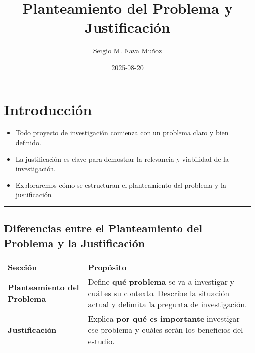 \documentclass[
  letterpaper,
  DIV=11,
  numbers=noendperiod]{scrartcl}
\title{Planteamiento del Problema y Justificación}
\author{Sergio M. Nava Muñoz}
\date{2025-08-20}
\providecommand{\tightlist}{%
  \setlength{\itemsep}{0pt}\setlength{\parskip}{0pt}}
\begin{document}
\maketitle


\section{Introducción}\label{introducciuxf3n}

\begin{itemize}
\tightlist
\item
  Todo proyecto de investigación comienza con un problema claro y bien
  definido.
\item
  La justificación es clave para demostrar la relevancia y viabilidad de
  la investigación.
\item
  Exploraremos cómo se estructuran el planteamiento del problema y la
  justificación.
\end{itemize}

\begin{center}\rule{0.5\linewidth}{0.5pt}\end{center}

\subsection{\texorpdfstring{\textbf{Diferencias entre el Planteamiento
del Problema y la
Justificación}}{Diferencias entre el Planteamiento del Problema y la Justificación}}\label{diferencias-entre-el-planteamiento-del-problema-y-la-justificaciuxf3n}

\begin{longtable}[]{@{}
  >{\raggedright\arraybackslash}p{}
  >{\raggedright\arraybackslash}p{}@{}}
\toprule\noalign{}
\begin{minipage}[b]{\linewidth}\raggedright
\textbf{Sección}
\end{minipage} & \begin{minipage}[b]{\linewidth}\raggedright
\textbf{Propósito}
\end{minipage} \\
\midrule\noalign{}
\endhead
\bottomrule\noalign{}
\endlastfoot
\textbf{Planteamiento del Problema} & Define \textbf{qué problema} se va
a investigar y cuál es su contexto. Describe la situación actual y
delimita la pregunta de investigación. \\
\textbf{Justificación} & Explica \textbf{por qué es importante}
investigar ese problema y cuáles serán los beneficios del estudio. \\
\end{longtable}
\end{document}
